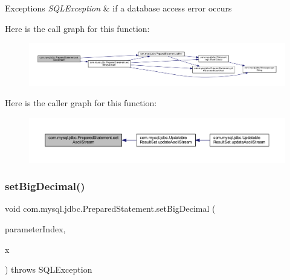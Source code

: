 \begin{DoxyExceptions}{Exceptions}
{\em S\+Q\+L\+Exception} & if a database access error occurs \\
\hline
\end{DoxyExceptions}
Here is the call graph for this function\+:
\nopagebreak
\begin{figure}[H]
\begin{center}
\leavevmode
\includegraphics[width=350pt]{classcom_1_1mysql_1_1jdbc_1_1_prepared_statement_ae3612d6b5fc893fa6e24ec026c40a100_cgraph}
\end{center}
\end{figure}
Here is the caller graph for this function\+:
\nopagebreak
\begin{figure}[H]
\begin{center}
\leavevmode
\includegraphics[width=350pt]{classcom_1_1mysql_1_1jdbc_1_1_prepared_statement_ae3612d6b5fc893fa6e24ec026c40a100_icgraph}
\end{center}
\end{figure}
\mbox{\label{classcom_1_1mysql_1_1jdbc_1_1_prepared_statement_ab398b97a7a8e7b77fa5d2ad422897cd7}} 
\subsubsection{\texorpdfstring{set\+Big\+Decimal()}{setBigDecimal()}}
{\footnotesize\ttfamily void com.\+mysql.\+jdbc.\+Prepared\+Statement.\+set\+Big\+Decimal (\begin{DoxyParamCaption}\item[{int}]{parameter\+Index,  }\item[{Big\+Decimal}]{x }\end{DoxyParamCaption}) throws S\+Q\+L\+Exception}

